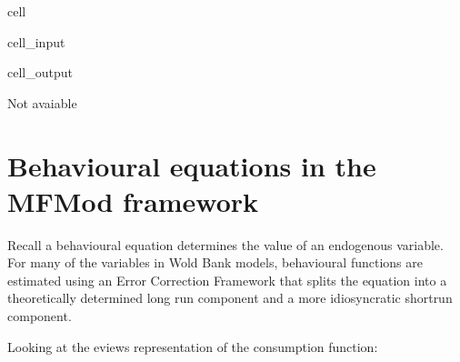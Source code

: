 \documentclass[letterpaper,10pt,english]{jupyterBook}
\begin{document}
\begin{sphinxuseclass}{cell}\begin{sphinxVerbatimInput}

\begin{sphinxuseclass}{cell_input}
\begin{sphinxVerbatim}[commandchars=\\\{\}]
\end{sphinxVerbatim}

\end{sphinxuseclass}\end{sphinxVerbatimInput}
\begin{sphinxVerbatimOutput}

\begin{sphinxuseclass}{cell_output}
\begin{sphinxVerbatim}[commandchars=\\\{\}]
Not avaiable
\end{sphinxVerbatim}

\end{sphinxuseclass}\end{sphinxVerbatimOutput}

\end{sphinxuseclass}

\section{Behavioural equations in the MFMod framework}
\label{\detokenize{content/06_WBModels/LoadingWBModel:behavioural-equations-in-the-mfmod-framework}}
\sphinxAtStartPar
Recall a behavioural equation determines the value of an endogenous variable. For many of the variables in Wold Bank models, behavioural functions are estimated using an Error Correction Framework that splits the equation into a theoretically determined long run component and a more idiosyncratic short\sphinxhyphen{}run component.

\sphinxAtStartPar
Looking at the eviews representation of the consumption function:

\sphinxAtStartPar
{}
\end{document}
